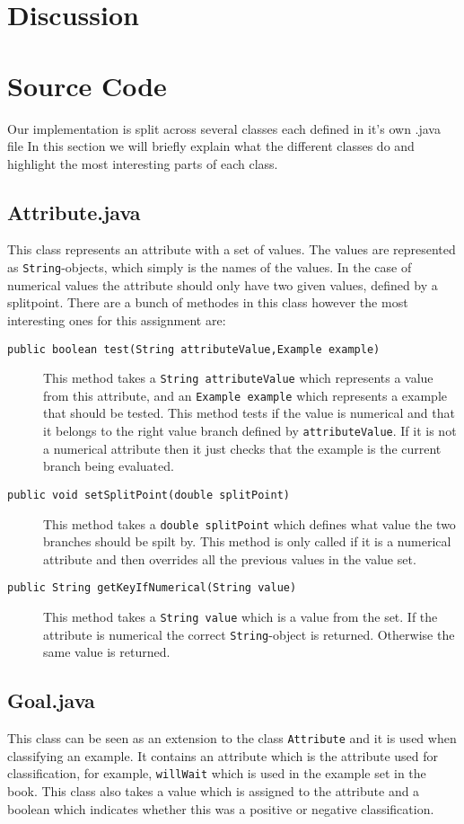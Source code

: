 \documentclass[a4paper]{article}
\begin{document}
\section{Discussion}

\section{Source Code}
Our implementation is split across several classes each defined in it's own .java file In this section we will briefly explain what the different classes do and highlight the most interesting parts of each class.

\subsection{Attribute.java}
This class represents an attribute with a set of values. The values are represented as \texttt{String}-objects, which simply is the names of the values. In the case of numerical values the attribute should only have two given values, defined by a splitpoint. There are a bunch of methodes in this class however the most interesting ones for this assignment are:
\begin{description}
\item[\texttt{public boolean test(String attributeValue,Example example)}] This method takes a \texttt{String attributeValue} which represents a value from this attribute, and an \texttt{Example example} which represents a example that should be tested. 
This method tests if the value is numerical and that it belongs to the right value branch defined by \texttt{attributeValue}. If it is not a numerical attribute then it just checks that the example is the current branch being evaluated.
\item[\texttt{public void setSplitPoint(double splitPoint)}] This method takes a \texttt{double splitPoint} which defines what value the two branches should be spilt by. This method is only called if it is a numerical attribute and then overrides all the previous values in the value set.
\item[\texttt{public String getKeyIfNumerical(String value)}] This method takes a \texttt{String value} which is a value from the set. If the attribute is numerical the correct \texttt{String}-object is returned. Otherwise the same value is returned. 
\end{description} 
\subsection{Goal.java}
This class can be seen as an extension to the class \texttt{Attribute} and it is used when classifying an example. It contains an attribute which is the attribute used for classification, for example, \texttt{willWait} which is used in the example set in the book. This class also takes a value which is assigned to the attribute and a boolean which indicates whether this was a positive or negative classification.
\end{document}
